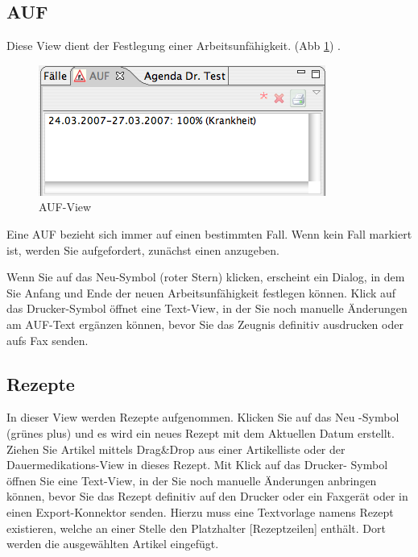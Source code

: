\subsection{AUF}
Diese View dient der Festlegung einer Arbeitsunfähigkeit. (Abb \ref{fig:auf})
 .
\begin{figure}
  \includegraphics{images/aufview}
  \caption{AUF-View}
  \label{fig:auf}
\end{figure}
Eine AUF bezieht sich immer auf einen bestimmten Fall. Wenn kein Fall markiert
ist, werden Sie aufgefordert, zunächst einen anzugeben.

Wenn Sie auf das \glqq Neu\grqq -Symbol (roter Stern) klicken, erscheint ein
Dialog, in dem Sie Anfang und Ende der neuen Arbeitsunfähigkeit festlegen
können. Klick auf das \glqq Drucker\grqq -Symbol öffnet eine Text-View, in der
Sie noch manuelle Änderungen am AUF-Text ergänzen können, bevor Sie das Zeugnis
definitiv ausdrucken oder aufs Fax senden.

\subsection{Rezepte}
In dieser View werden Rezepte aufgenommen. Klicken Sie auf das \glqq Neu\grqq
-Symbol (grünes plus) und es wird ein neues Rezept mit dem Aktuellen Datum
erstellt. Ziehen Sie Artikel mittels Drag\&Drop aus einer Artikelliste oder der
Dauermedikations-View in dieses Rezept. Mit Klick auf das \glqq Drucker\grqq -
Symbol öffnen Sie eine Text-View, in der Sie noch manuelle Änderungen anbringen
können, bevor Sie das Rezept definitiv auf den Drucker oder ein Faxgerät oder in
einen Export-Konnektor senden.
Hierzu muss eine Textvorlage namens \glqq Rezept\grqq
existieren, welche an einer Stelle den Platzhalter [Rezeptzeilen] enthält. Dort
werden die ausgewählten Artikel eingefügt.


